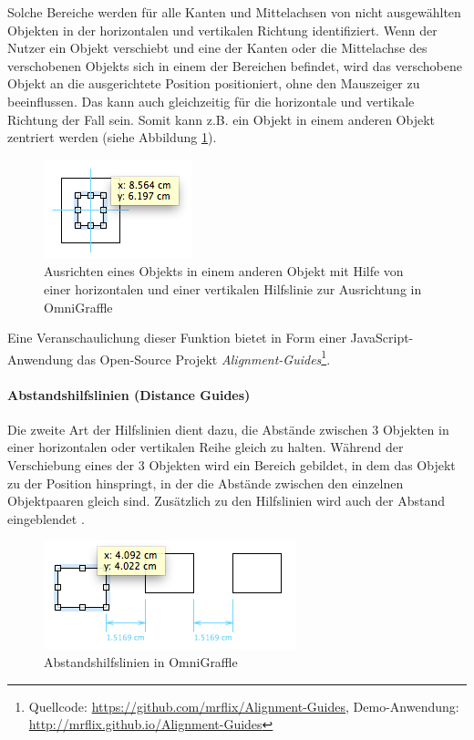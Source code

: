 
Solche Bereiche werden für alle Kanten und Mittelachsen von nicht ausgewählten Objekten in der horizontalen und vertikalen Richtung identifiziert. Wenn der Nutzer ein Objekt verschiebt und eine der Kanten oder die Mittelachse des verschobenen Objekts sich in einem der Bereichen befindet, wird das verschobene Objekt an die ausgerichtete Position positioniert, ohne den Mauszeiger zu beeinflussen. Das kann auch gleichzeitig für die horizontale und vertikale Richtung der Fall sein. Somit kann z.B. ein Objekt in einem anderen Objekt zentriert werden (siehe Abbildung \ref{fig:omnigraffle-alignment-guides-centering}).

\begin{figure}[hbt]
    \centering
    \includegraphics{resources/omnigraffle-alignment-guides-centering.png}
    \caption{Ausrichten eines Objekts in einem anderen Objekt mit Hilfe von einer horizontalen und einer vertikalen Hilfslinie zur Ausrichtung in OmniGraffle}
    \label{fig:omnigraffle-alignment-guides-centering}
\end{figure}

Eine Veranschaulichung dieser Funktion bietet in Form einer JavaScript-Anwendung das Open-Source Projekt \textit{Alignment-Guides}\footnote{Quellcode: \url{https://github.com/mrflix/Alignment-Guides}, Demo-Anwendung: \url{http://mrflix.github.io/Alignment-Guides}}.

\paragraph{Abstandshilfslinien (Distance Guides)}

Die zweite Art der Hilfslinien dient dazu, die Abstände zwischen 3 Objekten in einer horizontalen oder vertikalen Reihe gleich zu halten. Während der Verschiebung eines der 3 Objekten wird ein Bereich gebildet, in dem das Objekt zu der Position hinspringt, in der die Abstände zwischen den einzelnen Objektpaaren gleich sind. Zusätzlich zu den Hilfslinien wird auch der Abstand eingeblendet \cite{11Keynote, Olsen10OmniGraffle}.

\begin{figure}[hbt]
    \centering
    \includegraphics{resources/omnigraffle-distance-guides.png}
    \caption{Abstandshilfslinien in OmniGraffle}
    \label{fig:omnigraffle-distance-guides}
\end{figure}

